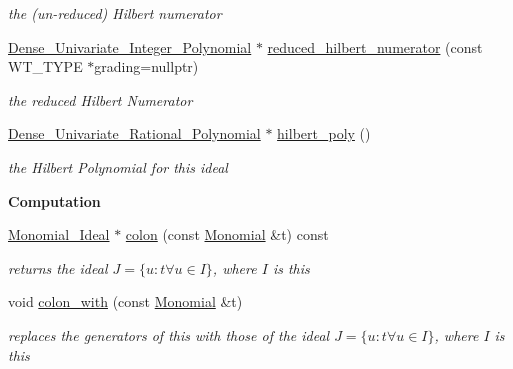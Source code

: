 \begin{Indent}
\begin{DoxyCompactItemize}
\begin{DoxyCompactList}\small\item\em the (un-\/reduced) Hilbert numerator \end{DoxyCompactList}\item 
\hyperlink{class_dense___univariate___integer___polynomial}{Dense\+\_\+\+Univariate\+\_\+\+Integer\+\_\+\+Polynomial} $\ast$ \hyperlink{class_monomial___ideal_a814e71b7c8df465869708bbcdf8f6007}{reduced\+\_\+hilbert\+\_\+numerator} (const W\+T\+\_\+\+T\+Y\+PE $\ast$grading=nullptr)
\begin{DoxyCompactList}\small\item\em the reduced Hilbert Numerator \end{DoxyCompactList}\item 
\hyperlink{class_dense___univariate___rational___polynomial}{Dense\+\_\+\+Univariate\+\_\+\+Rational\+\_\+\+Polynomial} $\ast$ \hyperlink{class_monomial___ideal_a2f5e73c22e492ea016a4c7ff117cc7a3}{hilbert\+\_\+poly} ()
\begin{DoxyCompactList}\small\item\em the Hilbert Polynomial for this ideal \end{DoxyCompactList}\end{DoxyCompactItemize}
\end{Indent}
\begin{Indent}\textbf{ Computation}\par
\begin{DoxyCompactItemize}
\item 
\hyperlink{class_monomial___ideal}{Monomial\+\_\+\+Ideal} $\ast$ \hyperlink{class_monomial___ideal_a708f7bc64b3e5d5ac3ea8e3b0cb15769}{colon} (const \hyperlink{class_monomial}{Monomial} \&t) const
\begin{DoxyCompactList}\small\item\em returns the ideal $J=\{u:t \forall u\in I\}$, where $I$ is {\ttfamily this} \end{DoxyCompactList}\item 
void \hyperlink{class_monomial___ideal_a2ae67955874f0a461952a89f6fb25647}{colon\+\_\+with} (const \hyperlink{class_monomial}{Monomial} \&t)
\begin{DoxyCompactList}\small\item\em replaces the generators of {\ttfamily this} with those of the ideal $J=\{u:t \forall u\in I\}$, where $I$ is {\ttfamily this} \end{DoxyCompactList}\end{DoxyCompactItemize}
\end{Indent}
